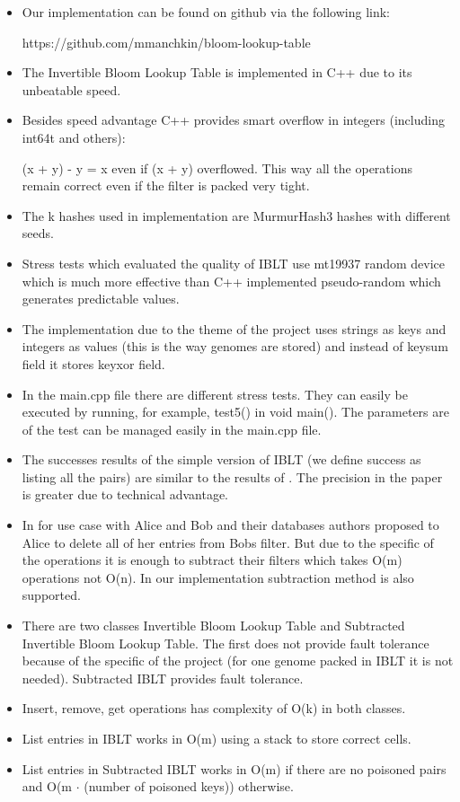 \documentclass{article}
\begin{document}
\begin{itemize}
    \item Our implementation can be found on github via the following link:

        https://github.com/mmanchkin/bloom-lookup-table

    \item The Invertible Bloom Lookup Table is implemented in C++ due to its unbeatable
speed. 
    \item Besides speed advantage C++ provides smart overflow in integers 
        (including int64t and others): 
        
        (x + y) - y = x even if (x + y) overflowed. This way all the operations
        remain correct even if the filter is packed very tight.
    \item The k hashes used in implementation are MurmurHash3 \textcite{repo} hashes with 
different seeds.
    \item Stress tests which evaluated the quality of IBLT use mt19937 random device
        which is much more effective than C++ implemented pseudo-random which generates
predictable values.
    \item The implementation due to the theme of the project uses strings as keys
        and integers as values (this is the way genomes are stored) and instead 
        of keysum field it stores keyxor field.
    \item In the main.cpp file there are different stress tests. They can easily 
        be executed by running, for example, test5() in void main(). The parameters
        are of the test can be managed easily in the main.cpp file.
    \item The successes results of the simple version of IBLT (we define success as listing all the pairs) 
        are similar to the results of \textcite{GoMi2011}. The precision in the
        paper is greater due to technical advantage.
    \item In \textcite{GoMi2011} for use case with Alice and Bob and their databases
        authors proposed to Alice to delete all of her entries from Bobs filter.
        But due to the specific of the operations it is enough to subtract their 
        filters which takes O(m) operations not O(n). In our implementation 
        subtraction method is also supported.
    \item There are two classes Invertible Bloom Lookup Table and Subtracted 
        Invertible Bloom Lookup Table. The first does not provide fault tolerance 
        because of the specific of the project (for one genome packed in IBLT it
        is not needed). Subtracted IBLT provides fault tolerance.
    \item Insert, remove, get operations has complexity of O(k) in both classes. 
    \item List entries in IBLT works in O(m) using a stack to store correct cells.
    \item List entries in Subtracted IBLT works in O(m) if there are no 
        poisoned pairs and O(m $\cdot$ (number of 
        poisoned keys)) otherwise.
\end{itemize}
\end{document}
